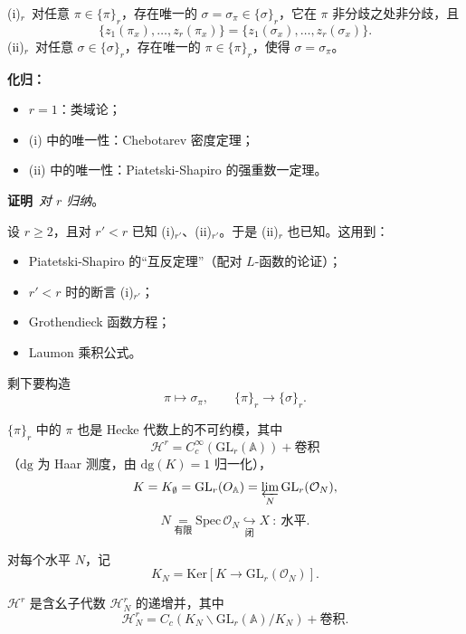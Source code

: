 \begin{theorem*}
(i)$_r$\ 对任意 $\pi \in \{\pi\}_r$，存在唯一的 $\sigma = \sigma_\pi \in \{\sigma\}_r$，它在 $\pi$ 非分歧之处非分歧，且
\[ \{z_1(\pi_x), \ldots, z_r(\pi_x)\} = \{z_1(\sigma_x), \ldots, z_r(\sigma_x)\}. \]
(ii)$_r$\ 对任意 $\sigma \in \{\sigma\}_r$，存在唯一的 $\pi \in \{\pi\}_r$，使得 $\sigma = \sigma_\pi$。
\end{theorem*}

\par\medskip\noindent\textbf{化归：}\
\begin{itemize}
\item $r = 1$：类域论；
\item (i) 中的唯一性：Chebotarev 密度定理；
\item {}(ii) 中的唯一性：Piatetski-Shapiro 的强重数一定理。
\end{itemize}

\par\medskip\noindent\textbf{证明}\ \emph{对 $r$ 归纳}。

设 $r \ge 2$，且对 $r' < r$ 已知 (i)$_{r'}$、(ii)$_{r'}$。于是 (ii)$_r$ 也已知。这用到：
\begin{itemize}
\item Piatetski-Shapiro 的“互反定理”（配对 $L$-函数的论证）；
\item $r' < r$ 时的断言 (i)$_{r'}$；
\item Grothendieck 函数方程；
\item Laumon 乘积公式。
\end{itemize}

剩下要构造
\[ \pi \mapsto \sigma_\pi, \qquad \{\pi\}_r \to \{\sigma\}_r. \]

$\{\pi\}_r$ 中的 $\pi$ 也是 Hecke 代数上的不可约模，其中
\[ \mathcal{H}^r = C_c^\infty(\mathrm{GL}_r(\mathbb{A})) + \text{卷积} \]
（$\mathrm{dg}$ 为 Haar 测度，由 $\mathrm{dg}(K) = 1$ 归一化），
\[ K = K_\emptyset = \mathrm{GL}_r(O_{\mathbb{A}}) = \varprojlim_{N} \mathrm{GL}_r(\mathcal{O}_N), \]
\[ N \underset{\text{有限}}{=} \mathrm{Spec}\,\mathcal{O}_N \underset{\text{闭}}{\hookrightarrow} X \ :\ \text{水平}. \]

对每个水平 $N$，记
\[ K_N = \mathrm{Ker}[K \to \mathrm{GL}_r(\mathcal{O}_N)]. \]

$\mathcal{H}^r$ 是含幺子代数 $\mathcal{H}^r_N$ 的递增并，其中
\[ \mathcal{H}^r_N = C_c(K_N\backslash \mathrm{GL}_r(\mathbb{A})/K_N) + \text{卷积}. \]

